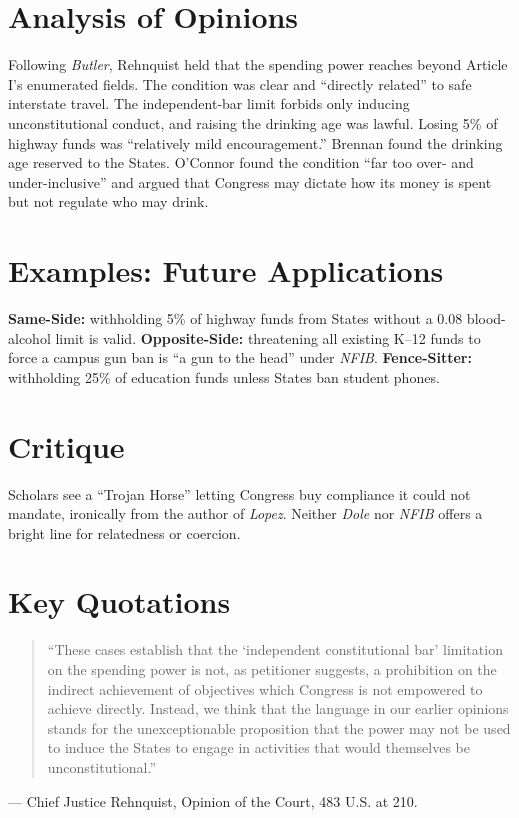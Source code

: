 \documentclass[12pt]{article}
\begin{document}
\section{Analysis of Opinions}
Following \textit{Butler}, Rehnquist held that the spending power reaches beyond Article I's enumerated fields. The condition was clear and ``directly related'' to safe interstate travel. The independent-bar limit forbids only inducing unconstitutional conduct, and raising the drinking age was lawful. Losing 5\% of highway funds was ``relatively mild encouragement.'' Brennan found the drinking age reserved to the States. O'Connor found the condition ``far too over- and under-inclusive'' and argued that Congress may dictate how its money is spent but not regulate who may drink.

\section{Examples: Future Applications}
\textbf{Same-Side:} withholding 5\% of highway funds from States without a 0.08 blood-alcohol limit is valid. \textbf{Opposite-Side:} threatening all existing K--12 funds to force a campus gun ban is ``a gun to the head'' under \textit{NFIB}. \textbf{Fence-Sitter:} withholding 25\% of education funds unless States ban student phones.

\section{Critique}
Scholars see a ``Trojan Horse'' letting Congress buy compliance it could not mandate, ironically from the author of \textit{Lopez}. Neither \textit{Dole} nor \textit{NFIB} offers a bright line for relatedness or coercion.

\section{Key Quotations}
\begin{quote}
``These cases establish that the `independent constitutional bar' limitation on the spending power is not, as petitioner suggests, a prohibition on the indirect achievement of objectives which Congress is not empowered to achieve directly. Instead, we think that the language in our earlier opinions stands for the unexceptionable proposition that the power may not be used to induce the States to engage in activities that would themselves be unconstitutional.''
\end{quote}
\noindent --- Chief Justice Rehnquist, Opinion of the Court, 483 U.S. at 210.
\end{document}
